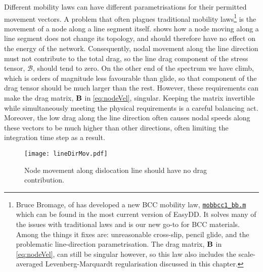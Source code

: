 Different mobility laws can have different parametrisations for their permitted movement vectors. A problem that often plagues traditional mobility laws\footnote{Bruce Bromage, of \cite{bromage2018calculating} has developed a new BCC mobility law, \href{https://github.com/TarletonGroup/EasyDD/blob/master/src/mobbcc_bb1b.m}{\texttt{mobbcc1\_bb.m}} which can be found in the most current version of EasyDD. It solves many of the issues with traditional laws and is our new go-to for BCC materials. Among the things it fixes are: unreasonable cross-slip, pencil glide, and the problematic line-direction parametrisation. The drag matrix, $\mathbf{B}$ in \cref{eq:nodeVel}, can still be singular however, so this law also includes the scale-averaged Levenberg-Marquardt regularisation discussed in this chapter.} is the movement of a node along a line segment itself.  shows how a node moving along a line segment does not change its topology, and should therefore have no effect on the energy of the network. Consequently, nodal movement along the line direction must not contribute to the total drag, so the line drag component of the stress tensor, $\mathcal{B}$, should tend to zero. On the other end of the spectrum we have climb, which is orders of magnitude less favourable than glide, so that component of the drag tensor should be much larger than the rest. However, these requirements can make the drag matrix, $\mathbf{B}$ in \cref{eq:nodeVel}, singular. Keeping the matrix invertible while simultaneously meeting the physical requirements is a careful balancing act. Moreover, the low drag along the line direction often causes nodal speeds along these vectors to be much higher than other directions, often limiting the integration time step as a result.
\begin{figure}
    \centering
    \texttt{[image: lineDirMov.pdf]}
    \caption{Node movement along dislocation line should have no drag contribution.}
    \label{f:lineMovement}
\end{figure}

